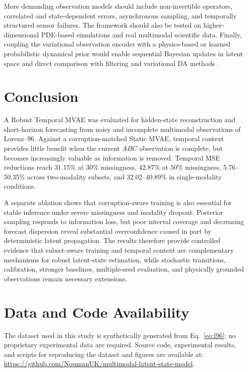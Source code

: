 \documentclass[10pt,twocolumn]{article}
\begin{document}
More demanding observation models should include non-invertible operators, correlated and state-dependent errors, asynchronous sampling, and temporally structured sensor failures. The framework should also be tested on higher-dimensional PDE-based simulations and real multimodal scientific data. Finally, coupling the variational observation encoder with a physics-based or learned probabilistic dynamical prior would enable sequential Bayesian updates in latent space and direct comparison with filtering and variational DA methods \citep{peyron2021latent}.

\section{Conclusion}
A Robust Temporal MVAE was evaluated for hidden-state reconstruction and short-horizon forecasting from noisy and incomplete multimodal observations of Lorenz--96. Against a corruption-matched Static MVAE, temporal context provides little benefit when the current $ABC$ observation is complete, but becomes increasingly valuable as information is removed. Temporal MSE reductions reach 31.15\% at 30\% missingness, 42.87\% at 50\% missingness, 5.76--50.35\% across two-modality subsets, and 32.02--40.89\% in single-modality conditions.

A separate ablation shows that corruption-aware training is also essential for stable inference under severe missingness and modality dropout. Posterior sampling responds to information loss, but poor interval coverage and decreasing forecast dispersion reveal substantial overconfidence caused in part by deterministic latent propagation. The results therefore provide controlled evidence that subset-aware training and temporal context are complementary mechanisms for robust latent-state estimation, while stochastic transitions, calibration, stronger baselines, multiple-seed evaluation, and physically grounded observations remain necessary extensions.



\section*{Data and Code Availability}
The dataset used in this study is synthetically generated from Eq.~\eqref{eq:l96}; no proprietary experimental data are required. Source code, experimental results, and scripts for reproducing the dataset and figures are available at: \url{https://github.com/NoumanUK/multimodal-latent-state-model}.





\end{document}
